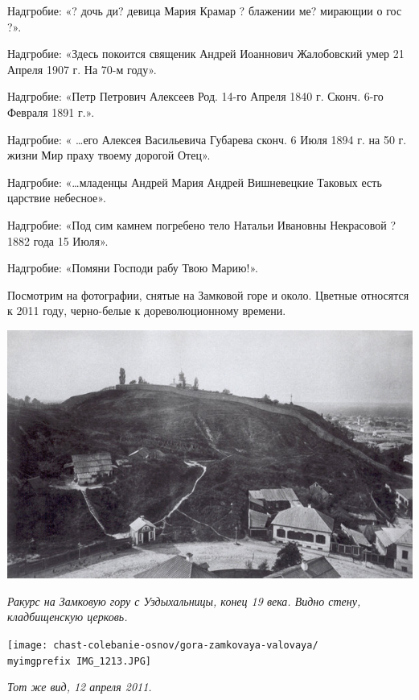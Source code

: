 Надгробие: «? дочь ди? девица Мария Крамар ? блажении ме? мирающии о гос ?».

Надгробие: «Здесь покоится священик Андрей Иоаннович Жалобовский умер 21 Апреля 1907 г. На 70-м году».

Надгробие: «Петр Петрович Алексеев Род. 14-го Апреля 1840 г. Сконч. 6-го Февраля 1891 г.».

Надгробие: « …его Алексея Васильевича Губарева 
сконч. 6 Июля 1894 г. на 50 г. жизни Мир праху твоему дорогой Отец».

Надгробие: «…младенцы Андрей Мария Андрей
Вишневецкие Таковых есть царствие небесное».

Надгробие: «Под сим камнем погребено тело Натальи Ивановны Некрасовой ? 1882 года 15 Июля».

Надгробие: «Помяни Господи рабу Твою Марию!».

Посмотрим на фотографии, снятые на Замковой горе и около. Цветные относятся к 2011 году, черно-белые к дореволюционному времени.

\newpage
\vspace*{\fill}
\begin{center}
\includegraphics[width=\linewidth]{chast-colebanie-osnov/gora-zamkovaya-valovaya/zamkovaya_s_uzd.jpg}

\textit{Ракурс на Замковую гору с Уздыхальницы, конец 19 века. Видно стену, кладбищенскую церковь.}
\end{center}

\begin{center}
\texttt{[image: chast-colebanie-osnov/gora-zamkovaya-valovaya/\\myimgprefix IMG\_1213.JPG]}

\textit{Тот же вид, 12 апреля 2011.}
\end{center}
\vspace*{\fill}
\newpage

